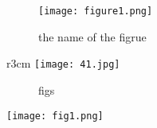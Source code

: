 \usepackage{graphicx,subfigure,wrapfig}%
\usepackage[all]{xy}
\begin{figure}[!htbp]
	\centering
	\texttt{[image: figure1.png]}
	\caption{the name of the figrue}
\end{figure}
\begin{wrapfigure}{r}{3cm} 
	\centering
	\texttt{[image: 41.jpg]}
\end{wrapfigure}
\begin{figure}[!htbp]
	\centering
	\quad
	\quad
	\quad
	\caption{figs}
\end{figure}
\begin{minipage}{0.1\textwidth}				
	\texttt{[image: fig1.png]}
\end{minipage}